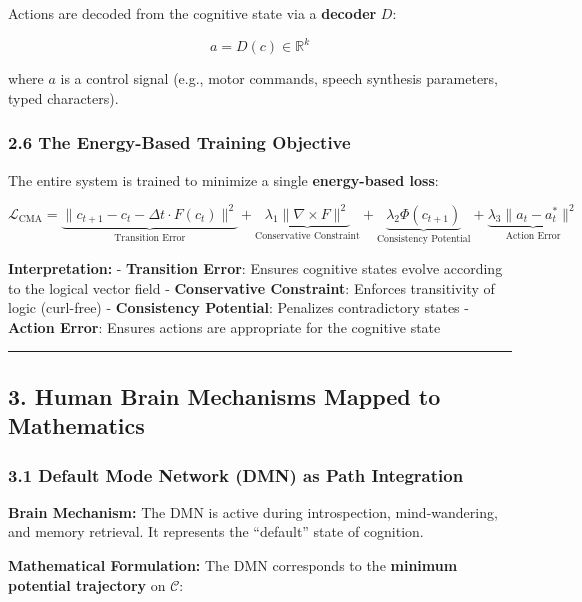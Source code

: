\documentclass[
  11pt,
  a4paper,
]{article}
\begin{document}
Actions are decoded from the cognitive state via a \textbf{decoder}
\(D\):

\[a = D(c) \in \mathbb{R}^k\]

where \(a\) is a control signal (e.g., motor commands, speech synthesis
parameters, typed characters).

\subsubsection{2.6 The Energy-Based Training
Objective}\label{the-energy-based-training-objective}

The entire system is trained to minimize a single \textbf{energy-based
loss}:

\[\mathcal{L}_{\text{CMA}} = \underbrace{\|c_{t+1} - c_t - \Delta t \cdot F(c_t)\|^2}_{\text{Transition Error}} + \underbrace{\lambda_1 \|\nabla \times F\|^2}_{\text{Conservative Constraint}} + \underbrace{\lambda_2 \Phi(c_{t+1})}_{\text{Consistency Potential}} + \underbrace{\lambda_3 \|a_t - a_t^*\|^2}_{\text{Action Error}}\]

\textbf{Interpretation:} - \textbf{Transition Error}: Ensures cognitive
states evolve according to the logical vector field -
\textbf{Conservative Constraint}: Enforces transitivity of logic
(curl-free) - \textbf{Consistency Potential}: Penalizes contradictory
states - \textbf{Action Error}: Ensures actions are appropriate for the
cognitive state

\begin{center}\rule{0.5\linewidth}{0.5pt}\end{center}

\subsection{3. Human Brain Mechanisms Mapped to
Mathematics}\label{human-brain-mechanisms-mapped-to-mathematics}

\subsubsection{3.1 Default Mode Network (DMN) as Path
Integration}\label{default-mode-network-dmn-as-path-integration}

\textbf{Brain Mechanism:} The DMN is active during introspection,
mind-wandering, and memory retrieval. It represents the ``default''
state of cognition.

\textbf{Mathematical Formulation:} The DMN corresponds to the
\textbf{minimum potential trajectory} on \(\mathcal{C}\):
\end{document}
